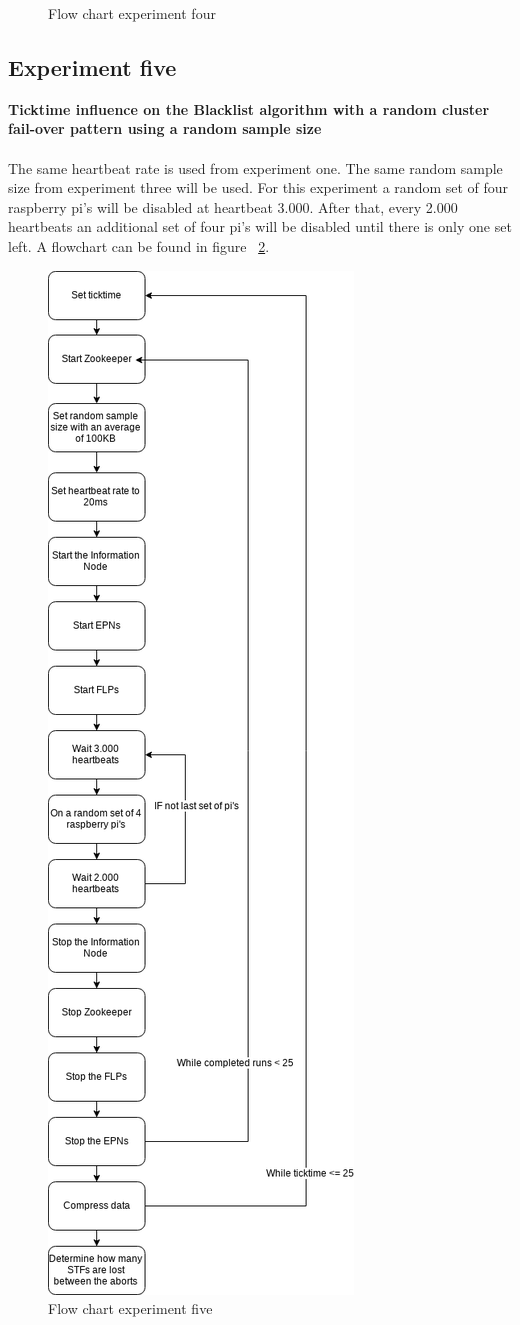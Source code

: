 \documentclass{report}
\begin{document}
\begin{figure}[htb]
	\caption{Flow chart experiment four}
	\label{fig:FlowChart4}
\end{figure}

\subsection{Experiment five}
\textbf{Ticktime influence on the Blacklist algorithm with a random cluster fail-over pattern using a random sample size}
\\~\\
The same heartbeat rate is used from experiment one. The same random sample size from experiment three will be used. For this experiment a random set of four raspberry pi's will be disabled at heartbeat 3.000. After that, every 2.000 heartbeats an additional set of four pi's will be disabled until there is only one set left. A flowchart can be found in figure ~\ref{fig:FlowChart5}.

\begin{figure}[htb]
	\centering
	\includegraphics[scale=0.3]{./graphics/ex5.png}
	\caption{Flow chart experiment five}
	\label{fig:FlowChart5}
\end{figure}
\end{document}
